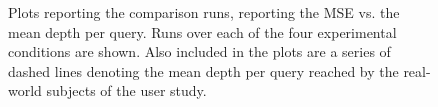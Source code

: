 \begin{figure}[t!]
    \centering
    \caption[Comparison plots (diversification)]{Plots reporting the comparison runs, reporting the MSE vs. the mean depth per query. Runs over each of the four experimental conditions are shown. Also included in the plots are a series of dashed lines denoting the mean depth per query reached by the real-world subjects of the user study.}
    \label{fig:ch8_sim_comparison_plots}
\end{figure}

